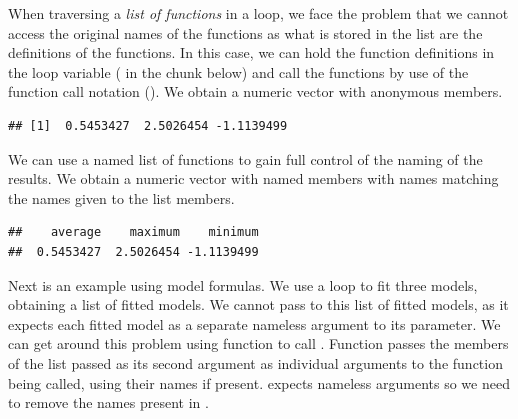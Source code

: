 \documentclass[krantz2]{krantz}\usepackage{knitr}
\begin{document}
When traversing a \emph{list of functions} in a loop, we face the problem that we cannot access the original names of the functions as what is stored in the list are the definitions of the functions. In this case, we can hold the function definitions in the loop variable ( in the chunk below) and call the functions by use of the function call notation (). We obtain a numeric vector with anonymous members.

\begin{knitrout}\footnotesize
{}\color{fgcolor}\begin{kframe}
\begin{alltt}
 \hlkwb{<-} \hlstd{()}
 \hlkwb{<-} 
   
    \hlkwb{<-}  
   \hlstd{\}}
\end{alltt}
\begin{verbatim}
## [1]  0.5453427  2.5026454 -1.1139499
\end{verbatim}
\end{kframe}
\end{knitrout}

We can use a named list of functions to gain full control of the naming of the results. We obtain a numeric vector with named members with names matching the names given to the list members.

\begin{knitrout}\footnotesize
{}\color{fgcolor}\begin{kframe}
\begin{alltt}
 \hlkwb{<-} \hlstd{()}
 \hlkwb{<-} \hlstd{(}     
   
    \hlkwb{<-} 
   \hlstd{\}}
\end{alltt}
\begin{verbatim}
##    average    maximum    minimum 
##  0.5453427  2.5026454 -1.1139499
\end{verbatim}
\end{kframe}
\end{knitrout}

Next is an example using model formulas. We use a loop to fit three models, obtaining a list of fitted models. We cannot pass to  this list of fitted models, as it expects each fitted model as a separate nameless argument to its \code{\ldots} parameter. We can get around this problem using function  to call . Function  passes the members of the list passed as its second argument as individual arguments to the function being called, using their names if present.  expects nameless arguments so we need to remove the names present in .
\end{document}
